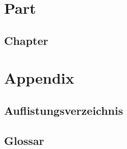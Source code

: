 

\usepackage[backend=biber, style=ieee]{biblatex}





    \renewcommand{\lstlistingname}{Auflistung}
    \renewcommand{\lstlistlistingname}{Auflistungsverzeichnis}

    

    \tableofcontents

    \hypersetup{linkcolor=cyan}

    \part{Part}
    \label{part}

    \chapter{Chapter}
    

    \part{Appendix}
    \appendix

    \hypersetup{linkcolor=black}
    \printbibliography[title=Literaturverzeichnis,heading=bibnumbered]

    \chapter{\listfigurename}
    \renewcommand{\listfigurename}{}
    \vspace{-5cm}
    \begingroup
    \let\clearpage\relax
    \listoffigures
    \endgroup

    \chapter{\listtablename}
    \renewcommand{\listtablename}{}
    \vspace{-5cm}
    \begingroup
    \let\clearpage\relax
    \listoftables
    \endgroup


    \chapter{\lstlistlistingname}
    \renewcommand{\lstlistlistingname}{}
    \vspace{-5cm}
    \begingroup
    \let\clearpage\relax
    \lstlistoflistings
    \endgroup


    \chapter{Glossar}
    \renewcommand{\glossarysection}[2][]{}
    \printglossary[style=altlist, nopostdot]

